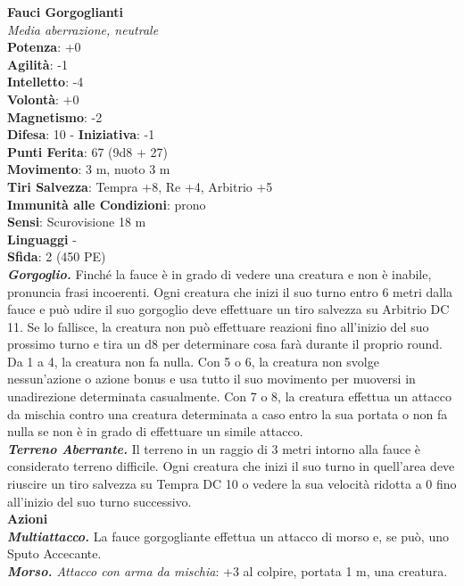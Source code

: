 \begin{multicols}{2}
\medskip\textbf{Fauci Gorgoglianti}\\
\emph{Media aberrazione, neutrale}\\
\textbf{Potenza}: +0\\
\textbf{Agilità}: -1\\
\textbf{Intelletto}: -4\\
\textbf{Volontà}: +0\\
\textbf{Magnetismo}: -2\\
\textbf{Difesa}: 10 - \textbf{Iniziativa}: -1\\
\textbf{Punti Ferita}: 67 (9d8 + 27)\\
\textbf{Movimento}: 3 m, nuoto 3 m\\
\textbf{Tiri Salvezza}: Tempra +8, Re +4, Arbitrio +5\\
\textbf{Immunità alle Condizioni}: prono\\
\textbf{Sensi}: Scurovisione 18 m\\
\textbf{Linguaggi} -\\
\textbf{Sfida}: 2 (450 PE)\smallskip\\
\emph{\textbf{Gorgoglio.}} Finché la fauce è in grado di vedere una creatura e non è inabile, pronuncia frasi incoerenti. Ogni creatura che inizi il suo turno entro 6 metri dalla fauce e può udire il suo gorgoglio deve effettuare un tiro salvezza su Arbitrio DC 11. Se lo fallisce, la creatura non può effettuare reazioni fino all'inizio del suo prossimo turno e tira un d8 per determinare cosa farà durante il proprio round. Da 1 a 4, la creatura non fa nulla. Con 5 o 6, la creatura non svolge nessun'azione o azione bonus e usa tutto il suo movimento per muoversi in unadirezione determinata casualmente. Con 7 o  8, la creatura effettua un attacco da mischia contro una creatura determinata a caso entro la sua portata o non fa nulla se non è in grado di effettuare un simile attacco.\\
\emph{\textbf{Terreno Aberrante.}} Il terreno in un raggio di 3 metri intorno alla fauce è considerato terreno difficile. Ogni creatura che inizi il suo turno in quell'area deve riuscire un tiro salvezza su Tempra DC 10 o vedere la sua velocità ridotta a 0 fino all'inizio del suo turno successivo.\\
\smallskip\textbf{Azioni}\\
\emph{\textbf{Multiattacco.}} La fauce gorgogliante effettua un attacco di morso e, se può, uno Sputo Accecante.\\
\emph{\textbf{Morso.} Attacco con arma da mischia}: +3 al colpire, portata 1 m, una creatura.\\

\end{multicols}

